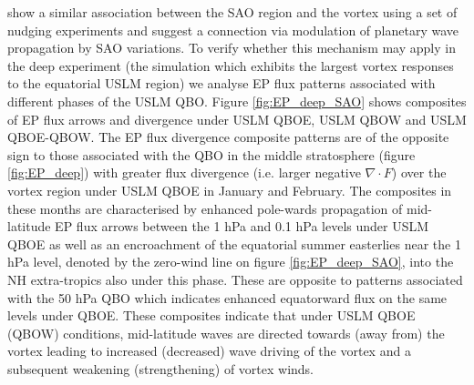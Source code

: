 \cite{grayForecasting2020a} show a similar association between the SAO region and the vortex using a set of nudging experiments and suggest a connection via modulation of planetary wave propagation by SAO variations. To verify whether this mechanism may apply in the deep experiment (the simulation which exhibits the largest vortex responses to the equatorial USLM region) we analyse EP flux patterns associated with  different phases of the USLM QBO. Figure \ref{fig:EP_deep_SAO} shows composites of EP flux arrows and divergence under USLM QBOE, USLM QBOW and USLM QBOE-QBOW. The EP flux divergence composite patterns are of the opposite sign to those associated with the QBO in the middle stratosphere (figure \ref{fig:EP_deep}) with greater flux divergence (i.e. larger negative $\nabla \cdot F$) over the vortex region under USLM QBOE in January and February. The composites in these months are characterised by enhanced pole-wards propagation of mid-latitude EP flux arrows between the 1 hPa and 0.1 hPa levels under USLM QBOE as well as an encroachment of the equatorial summer easterlies near the 1 hPa level, denoted by the zero-wind line on figure \ref{fig:EP_deep_SAO}, into the NH extra-tropics also under this phase. These are opposite to patterns associated with the 50 hPa QBO which indicates enhanced equatorward flux on the same levels under QBOE. These composites indicate that under USLM QBOE (QBOW) conditions, mid-latitude waves are directed towards (away from) the vortex leading to increased (decreased) wave driving of the vortex and a subsequent weakening (strengthening) of vortex winds.


